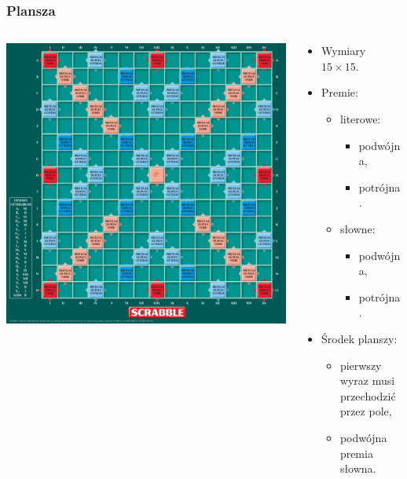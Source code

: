 \documentclass[10pt,a4paper]{beamer}
\begin{document}
\begin{frame}
	\frametitle{Plansza}
	
	\begin{columns}[onlytextwidth]
		\begin{column}{0.55\textwidth}
			\includegraphics[scale=0.17]{graphics/board.jpg}
		\end{column}
		\begin{column}{0.45\textwidth}
			\begin{itemize}
				\item Wymiary $15 \times 15$.
				\item Premie:
					\begin{itemize}
						\item literowe:
							\begin{itemize}
								\item podwójna,
								\item potrójna.
							\end{itemize}
						\item słowne:
							\begin{itemize}
								\item podwójna,
								\item potrójna.
							\end{itemize}
					\end{itemize}
				\item Środek planszy:
					\begin{itemize}
						\item pierwszy wyraz musi przechodzić przez pole,
						\item podwójna premia słowna.
					\end{itemize}
			\end{itemize}
		\end{column}
	\end{columns}
\end{frame}
\end{document}
